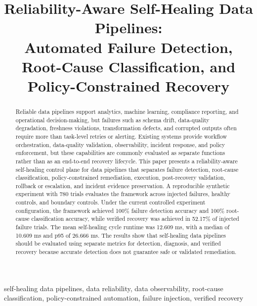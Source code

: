 \documentclass[conference]{IEEEtran}
\begin{document}
\title{Reliability-Aware Self-Healing Data Pipelines:\\ Automated Failure Detection, Root-Cause Classification, and Policy-Constrained Recovery}

\author{
}

\maketitle

\begin{abstract}
Reliable data pipelines support analytics, machine learning, compliance reporting, and operational decision-making, but failures such as schema drift, data-quality degradation, freshness violations, transformation defects, and corrupted outputs often require more than task-level retries or alerting. Existing systems provide workflow orchestration, data-quality validation, observability, incident response, and policy enforcement, but these capabilities are commonly evaluated as separate functions rather than as an end-to-end recovery lifecycle. This paper presents a reliability-aware self-healing control plane for data pipelines that separates failure detection, root-cause classification, policy-constrained remediation, execution, post-recovery validation, rollback or escalation, and incident evidence preservation. A reproducible synthetic experiment with 780 trials evaluates the framework across injected failures, healthy controls, and boundary controls. Under the current controlled experiment configuration, the framework achieved 100\% failure detection accuracy and 100\% root-cause classification accuracy, while verified recovery was achieved in 52.17\% of injected failure trials. The mean self-healing cycle runtime was 12.609 ms, with a median of 10.609 ms and p95 of 26.666 ms. The results show that self-healing data pipelines should be evaluated using separate metrics for detection, diagnosis, and verified recovery because accurate detection does not guarantee safe or validated remediation.
\end{abstract}

\begin{IEEEkeywords}
self-healing data pipelines, data reliability, data observability, root-cause classification, policy-constrained automation, failure injection, verified recovery
\end{IEEEkeywords}
\end{document}
